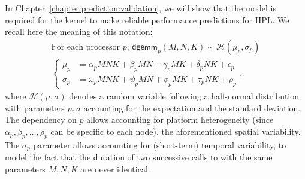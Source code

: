             In Chapter~\ref{chapter:prediction:validation}, we will show that the model  is
            required for the \dgemm kernel to make reliable performance predictions for HPL. We recall here the meaning
            of this notation:
            \begin{equation}
                \label{eq:dgemm.complex}
                \begin{split}
                    \text{For each processor $p$, } \textsf{dgemm}_{p}(M, N, K) \sim \mathcal{H}(\mu_{p}, \sigma_{p})\\
                    \begin{cases}
                        \mu_p &= \alpha_pMNK + \beta_pMN + \gamma_pMK + \delta_pNK + \epsilon_p\\
                        \sigma_p &= \omega_pMNK + \psi_pMN + \phi_pMK + \tau_pNK + \rho_p
                    \end{cases},
                \end{split}
            \end{equation}
            where \(\mathcal{H}(\mu, \sigma)\) denotes a random variable following a half-normal distribution with
            parameters \(\mu,\sigma\) accounting for the expectation and the standard deviation. The dependency on \(p\)
            allows accounting for platform heterogeneity (since \(\alpha_p,\beta_p, \dots,\rho_p\) can be specific to
            each node), \ie the aforementioned spatial variability. The \(\sigma_p\) parameter allows accounting for
            (short-term) temporal variability, \ie to model the fact that the duration of two successive calls to \dgemm
            with the same parameters \(M, N, K\) are never identical.

